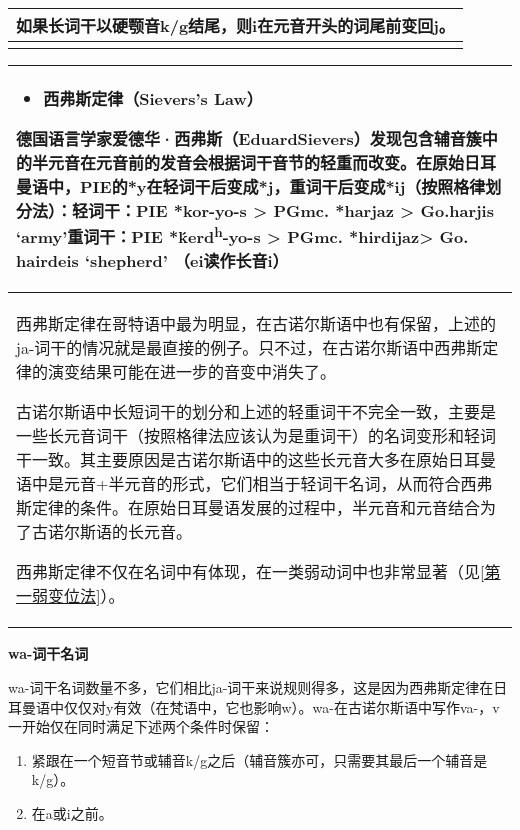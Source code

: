 \begin{longtable}{l}
  \toprule
  如果长词干以硬颚音k/g结尾，则i在元音开头的词尾前变回j。 \\
  \midrule
  \endhead
  \bottomrule
  \endfoot
\end{longtable}

\begin{longtable}{l}
  \toprule
  \begin{itemize}\item  西弗斯定律（Sievers\textbf{'}s Law）\end{itemize}德国语言学家爱德华·西弗斯（EduardSievers）发现包含辅音簇中的半元音在元音前的发音会根据词干音节的轻重而改变。在原始日耳曼语中，PIE的*y在\textbf{轻词干}后变成*j，\textbf{重词干}后变成*ij（按照格律划分法）：轻词干：PIE *kor-yo-s \textgreater{} PGmc. *harjaz \textgreater{} Go.harjis `army'重词干：PIE *ḱerd\textsuperscript{h}-yo-s \textgreater{} PGmc. *hirdijaz\textgreater{} Go. hairdeis `shepherd' （ei读作长音i） \\
  \midrule
  \endhead
  \bottomrule
  \endfoot
  西弗斯定律在哥特语中最为明显，在古诺尔斯语中也有保留，上述的ja-词干的情况就是最直接的例子。只不过，在古诺尔斯语中西弗斯定律的演变结果可能在进一步的音变中消失了。

  古诺尔斯语中长短词干的划分和上述的轻重词干不完全一致，主要是一些长元音词干（按照格律法应该认为是重词干）的名词变形和轻词干一致。其主要原因是古诺尔斯语中的这些长元音大多在原始日耳曼语中是元音+半元音的形式，它们相当于轻词干名词，从而符合西弗斯定律的条件。在原始日耳曼语发展的过程中，半元音和元音结合为了古诺尔斯语的长元音。

  西弗斯定律不仅在名词中有体现，在一类弱动词中也非常显著（见\ref{第一弱变位法}）。                                                                                                                                                                                                                                                                                                                                                   \\
\end{longtable}

\textbf{wa-词干名词}

wa-词干名词数量不多，它们相比ja-词干来说规则得多，这是因为西弗斯定律在日耳曼语中仅仅对y有效（在梵语中，它也影响w）。wa-在古诺尔斯语中写作va-，v一开始仅在同时满足下述两个条件时保留：

\begin{enumerate}
  \def\labelenumi{\arabic{enumi})}
  \item
        紧跟在一个短音节或辅音k/g之后（辅音簇亦可，只需要其最后一个辅音是k/g）。
  \item
        在a或i之前。
\end{enumerate}

